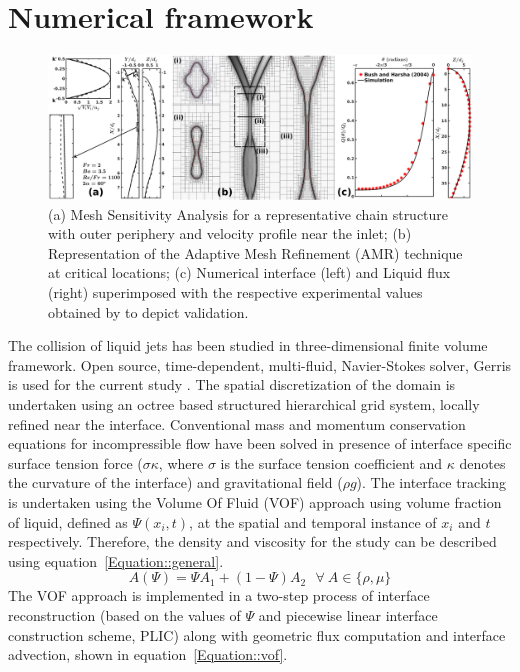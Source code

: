\documentclass{jfm}
\begin{document}
\section{Numerical framework}
\begin{figure}
	\centering
	\includegraphics[width=\linewidth]{Figure2}
	\caption{(a) Mesh Sensitivity Analysis for a representative chain structure with outer periphery and velocity profile near the inlet; (b) Representation of the Adaptive Mesh Refinement (AMR) technique at critical locations; (c) Numerical interface (left) and Liquid flux (right) superimposed with the respective experimental values obtained by \cite{bush2004collision} to depict validation.}
	\label{Figure::gisetal}
\end{figure}
The collision of liquid jets has been studied in three-dimensional finite volume framework. Open source, time-dependent, multi-fluid, Navier-Stokes solver, Gerris is used for the current study \citep{Popinet2003}. The spatial discretization of the domain is undertaken using an octree based structured hierarchical grid system, locally refined near the interface. Conventional mass and momentum conservation equations for incompressible flow have been solved in presence of interface specific surface tension force ($\sigma \kappa$, where $\sigma$ is the surface tension coefficient and $\kappa$ denotes the curvature of the interface) and gravitational field ($\rho g$). The interface tracking is undertaken using the Volume Of Fluid (VOF) approach using volume fraction of liquid, defined as $\Psi(x_i, t)$, at the spatial and temporal instance of $x_i$ and $t$ respectively. Therefore, the density and viscosity for the study can be described using equation~\ref{Equation::general}.
\begin{equation} \label{Equation::general}
A (\Psi) = \Psi A_1 + (1-\Psi)A_2 \: \: \:  \forall  \: A \in \{\rho, \mu\}
\end{equation}
The VOF approach is implemented in a two-step process of interface reconstruction (based on the values of $\Psi$ and piecewise linear interface construction scheme, PLIC) along with geometric flux computation and interface advection, shown in equation~\ref{Equation::vof}.
\end{document}

